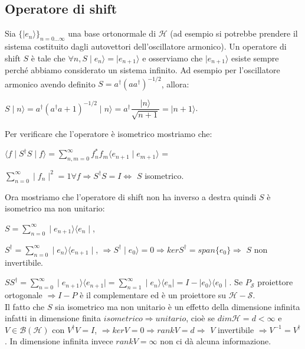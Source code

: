 \subsection{Operatore di shift} %
Sia $\lbrace \mid e_{n} \rangle \rbrace_{n=0... \infty}$ una base ortonormale di $\mathcal{H}$ (ad esempio si potrebbe prendere il sistema costituito  dagli autovettori dell'oscillatore armonico). Un operatore di shift $S$ è tale che $\forall n, S\mid e_{n}\rangle = \mid e_{n+1} \rangle$ e osserviamo che $\mid e_{n+1} \rangle$ esiste sempre perché abbiamo considerato un sistema infinito.
\pagebreak
\newpage
Ad esempio per l'oscillatore armonico avendo definito $S=a^{\dag}(aa^{\dag})^{-1 \slash 2}$, allora:
\begin{center} $S\mid n \rangle = a^{\dag}(a^{\dag}a+1)^{-1 \slash 2}\mid n \rangle = a^{\dag} \dfrac{\mid n \rangle}{\sqrt{n+1}}=\mid n+1 \rangle$. \end{center}
Per verificare che l'operatore è isometrico mostriamo che:
\begin{center} $\langle f \mid S^{\dag}S \mid f \rangle = \sum_{n,m=0}^{\infty} f_{n}^{*} f_{m} \langle e_{n+1} \mid e_{m+1} \rangle$ = \end{center}
\begin{center} $\sum_{n=0}^{\infty} \mid f_{n} \mid ^{2} = 1  \forall f \Rightarrow S^{\dag}S=I \Leftrightarrow$ $S$  isometrico. \end{center}
Ora mostriamo che l'operatore di shift non ha inverso a destra quindi $S$ è isometrico ma non unitario:
\begin{center} $S=\sum_{n=0}^{\infty} \mid e_{n+1}\rangle \langle e_{n} \mid$, \end{center}
\begin{center} $S^{\dag}=\sum_{n=0}^{\infty} \mid e_{n}\rangle \langle e_{n+1} \mid$, $\Rightarrow S^{\dag} \mid e_{0} \rangle =0 \Rightarrow kerS^{\dag}=span\lbrace e_{0} \rbrace\Rightarrow$ $S$ non invertibile.\end{center}
$ SS^{\dag}=\sum_{n=0}^{\infty} \mid e_{n+1}\rangle \langle e_{n+1} \mid =\sum_{n=1}^{\infty} \mid e_{n}\rangle \langle e_{n} \mid = I - \mid e_{0} \rangle \langle e_{0} \mid$. Se $P_{\mathcal{S}}$ proiettore ortogonale $\Rightarrow I-P$ è il complementare ed è un proiettore su $\mathcal{H} - \mathcal{S}$.\\
Il fatto che $S$ sia isometrico ma non unitario è un effetto della dimensione infinita infatti in dimensione finita $isometrico \Rightarrow unitario$, cioè se $dim\mathcal{H}=d<\infty$ e $V \in \mathcal{B}(\mathcal{H})$ con $V^{\dag}V=I$, $\Rightarrow kerV=0 \Rightarrow rankV=d \Rightarrow$ $V$ invertibile $\Rightarrow V^{-1}=V^{\dag}$. In dimensione infinita invece $rankV= \infty$ non ci dà alcuna informazione.



